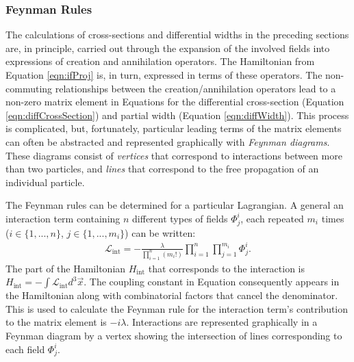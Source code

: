 \subsubsection{Feynman Rules}\label{sec:feynmanRules}
The calculations of cross-sections and differential widths in the preceding sections are, in principle, carried out through the expansion of the involved fields into expressions of creation and annihilation operators.
The Hamiltonian from Equation \ref{eqn:ifProj} is, in turn, expressed in terms of these operators.
The non-commuting relationships between the creation/annihilation operators lead to a non-zero matrix element in Equations for the differential cross-section (Equation \ref{eqn:diffCrossSection}) and partial width (Equation \ref{eqn:diffWidth}).
This process is complicated, but, fortunately, particular leading terms of the matrix elements can often be abstracted and represented graphically with \emph{Feynman diagrams}.
These diagrams consist of \emph{vertices} that correspond to interactions between more than two particles, and \emph{lines} that correspond to the free propagation of an individual particle.

The Feynman rules can be determined for a particular Lagrangian.
A general an interaction term containing $n$ different types of fields $\Phi^i_j$, each repeated $m_i$ times ($i\in\{1,...,n\}$, $j\in\{1,...,m_i\}$) can be written:
\begin{equation}\begin{split}\label{eqn:feynmanRuleInt}
\mathcal{L}_\text{int}=-\frac{\lambda}{\prod_{i=1}^n (m_i!)}\prod_{i=1}^n\prod_{j=1}^{m_i}\Phi^i_j.
\end{split}\end{equation}
The part of the Hamiltonian $H_\text{int}$ that corresponds to the interaction is $H_\text{int}=-\int\mathcal{L}_\text{int}d^3\vec{x}$.
The coupling constant in Equation \label{eqn:feynmanRuleInt} consequently appears in the Hamiltonian along with combinatorial factors that cancel the denominator.
This is used to calculate the Feynman rule for the interaction term's contribution to the matrix element is $-i\lambda$.
Interactions are represented graphically in a Feynman diagram by a vertex showing the intersection of lines corresponding to each field $\Phi^i_j$.

